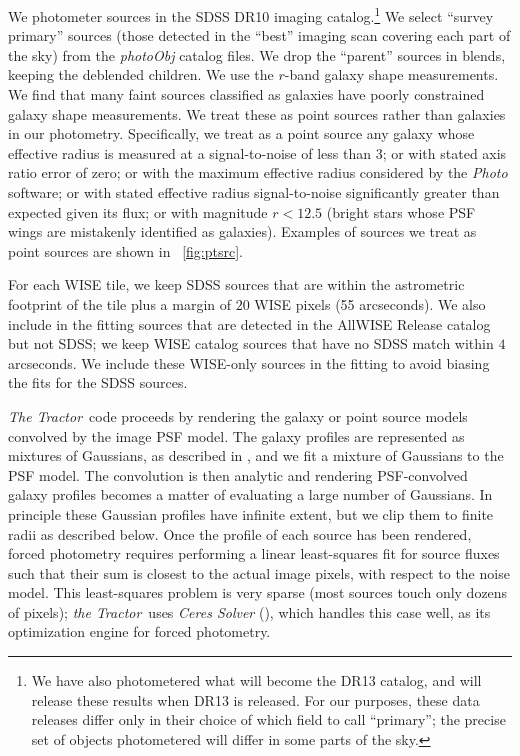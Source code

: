 \documentclass[12pt,preprint]{aastex}
\newcommand{\figref}[1]{\figurename~\ref{#1}}
\newcommand{\thetractor}{\textsl{the Tractor}}
\newcommand{\Thetractor}{\textsl{The Tractor}}
\begin{document}
We photometer sources in the SDSS DR10 imaging catalog.\footnote{We
  have also photometered what will become the DR13 catalog, and will
  release these results when DR13 is released.  For our purposes,
  these data releases differ only in their choice of which field to
  call ``primary''; the precise set of objects photometered will
  differ in some parts of the sky.}
%
We select ``survey primary'' sources (those detected in the ``best''
imaging scan covering each part of the sky) from the \emph{photoObj}
catalog files.  We drop the ``parent'' sources in blends, keeping the
deblended children.  We use the $r$-band galaxy shape measurements.
We find that many faint sources classified as galaxies have poorly
constrained galaxy shape measurements.  We treat these as point
sources rather than galaxies in our photometry.  Specifically, we
treat as a point source any galaxy whose effective radius is measured
at a signal-to-noise of less than 3; or with stated axis ratio error
of zero; or with the maximum effective radius considered by the
\emph{Photo} software; or with stated effective radius signal-to-noise
significantly greater than expected given its flux; or with magnitude
$r < 12.5$ (bright stars whose PSF wings are mistakenly identified as
galaxies).  Examples of sources we treat as point sources are shown in
\figref{fig:ptsrc}.


For each WISE tile, we keep SDSS sources that are within the astrometric
footprint of the tile plus
a margin of $20$ WISE pixels (55 arcseconds).  We also include in the
fitting sources that are detected in the AllWISE Release catalog but
not SDSS; we keep WISE catalog sources that have no SDSS match within
$4$ arcseconds.  We include these WISE-only sources in the fitting to
avoid biasing the fits for the SDSS sources.



\Thetractor\ code proceeds by rendering the galaxy or point source
models convolved by the image PSF model.  The galaxy profiles are
represented as mixtures of Gaussians, as described in
\citet{profiles}, and we fit a mixture of Gaussians to the PSF model.
The convolution is then analytic and rendering PSF-convolved galaxy
profiles becomes a matter of evaluating a large number of Gaussians.
In principle these Gaussian profiles have infinite extent, but we clip
them to finite radii as described below.  Once the profile of each
source has been rendered, forced photometry requires performing a
linear least-squares fit for source fluxes such that their sum is
closest to the actual image pixels, with respect to the noise model.
This least-squares problem is very sparse (most sources touch only
dozens of pixels); \thetractor\ uses \emph{Ceres Solver}
(\citealt{agarwal}), which handles this case well, as its optimization
engine for forced photometry.
\end{document}
